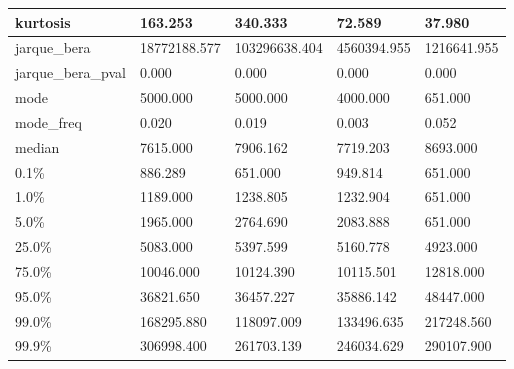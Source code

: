 \begin{table}[H]
\begin{tabular}{|l|m{10em}|m{10em}|m{10em}|m{10em}|}
\hline kurtosis & 163.253 & 340.333 & 72.589 & 37.980 \\
\hline jarque\_bera & 18772188.577 & 103296638.404 & 4560394.955 & 1216641.955 \\
\hline jarque\_bera\_pval & 0.000 & 0.000 & 0.000 & 0.000 \\
\hline mode & 5000.000 & 5000.000 & 4000.000 & 651.000 \\
\hline mode\_freq & 0.020 & 0.019 & 0.003 & 0.052 \\
\hline median & 7615.000 & 7906.162 & 7719.203 & 8693.000 \\
\hline 0.1\% & 886.289 & 651.000 & 949.814 & 651.000 \\
\hline 1.0\% & 1189.000 & 1238.805 & 1232.904 & 651.000 \\
\hline 5.0\% & 1965.000 & 2764.690 & 2083.888 & 651.000 \\
\hline 25.0\% & 5083.000 & 5397.599 & 5160.778 & 4923.000 \\
\hline 75.0\% & 10046.000 & 10124.390 & 10115.501 & 12818.000 \\
\hline 95.0\% & 36821.650 & 36457.227 & 35886.142 & 48447.000 \\
\hline 99.0\% & 168295.880 & 118097.009 & 133496.635 & 217248.560 \\
\hline 99.9\% & 306998.400 & 261703.139 & 246034.629 & 290107.900 \\
\hline
\end{tabular}
\end{table}
